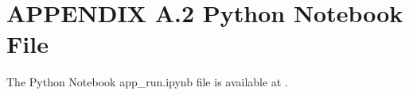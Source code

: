 \newpage

\section*{APPENDIX A.2 Python Notebook File}

The Python Notebook app\_run.ipynb file is available at \textcolor{blue}{}.


% 



\newpage








